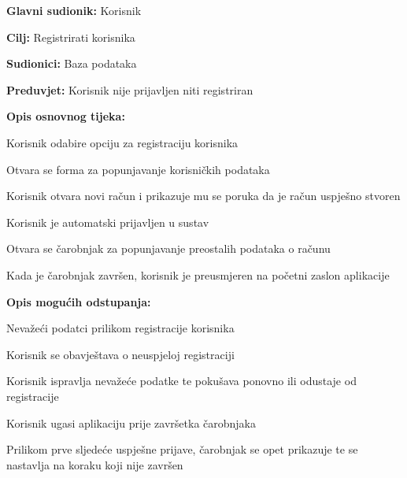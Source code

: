 \noindent {}
\begin{packed_item}

	\item \textbf{Glavni sudionik:} Korisnik
	\item \textbf{Cilj:} Registrirati korisnika
	\item \textbf{Sudionici:} Baza podataka
	\item \textbf{Preduvjet:} Korisnik nije prijavljen niti registriran
	\item \textbf{Opis osnovnog tijeka:}
	
	\item[] \begin{packed_enum}
		
		\item Korisnik odabire opciju za registraciju korisnika
		\item Otvara se forma za popunjavanje korisničkih podataka
		\item Korisnik otvara novi račun i prikazuje mu se poruka da je račun uspješno stvoren
		\item Korisnik je automatski prijavljen u sustav
		\item Otvara se čarobnjak za popunjavanje preostalih podataka o računu
		\item Kada je čarobnjak završen, korisnik je preusmjeren na početni zaslon aplikacije

	\end{packed_enum}

	\item  \textbf{Opis mogućih odstupanja:}
	
	\item[] \begin{packed_item}
	
		\item[3.a] Nevažeći podatci prilikom registracije korisnika
		\item[] \begin{packed_enum}
			
			\item Korisnik se obavještava o neuspjeloj registraciji
			\item Korisnik ispravlja nevažeće podatke te pokušava ponovno ili odustaje od registracije
			
		\end{packed_enum}
		
		\item[4.a] Korisnik ugasi aplikaciju prije završetka čarobnjaka
		\item[] \begin{packed_enum}
			
			\item Prilikom prve sljedeće uspješne prijave, čarobnjak se opet prikazuje te se nastavlja na koraku koji nije završen
			
		\end{packed_enum}
		
	\end{packed_item}
\end{packed_item}

